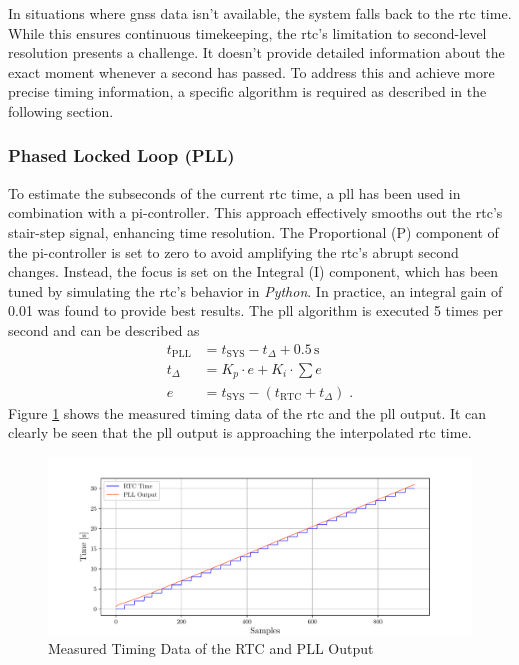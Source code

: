 In situations where \acrshort{gnss} data isn't available, the system falls back to the \acrshort{rtc} time.
While this ensures continuous timekeeping, the \acrshort{rtc}'s limitation to second-level resolution presents a challenge.
It doesn't provide detailed information about the exact moment whenever a second has passed.
To address this and achieve more precise timing information, a specific algorithm is required as described in the following section.

\subsubsection{Phased Locked Loop (PLL)}
To estimate the subseconds of the current \acrshort{rtc} time, a \acrfull{pll} has been used in combination with a \acrshort{pi}-controller.
This approach effectively smooths out the \acrshort{rtc}'s stair-step signal, enhancing time resolution.
The Proportional (P) component of the \acrshort{pi}-controller is set to zero to avoid amplifying the \acrshort{rtc}'s abrupt second changes.
Instead, the focus is set on the Integral (I) component, which has been tuned by simulating the \acrshort{rtc}'s behavior in \textit{Python}.
In practice, an integral gain of 0.01 was found to provide best results.
The \acrshort{pll} algorithm is executed 5 times per second and can be described as
\begin{equation}
	\begin{aligned}
		t_{\text{PLL}}
		 & =
		t_{\text{SYS}} - t_\Delta  + 0.5\,\text{s} \\
		t_\Delta
		 & =
		K_p \cdot e + K_i \cdot \sum e             \\
		e
		 & =
		t_{\text{SYS}} - (t_{\text{RTC}} + t_\Delta) \;.
	\end{aligned}
\end{equation}
Figure \ref{fig:pll_measured_data} shows the measured timing data of the \acrshort{rtc} and the \acrshort{pll} output.
It can clearly be seen that the \acrshort{pll} output is approaching the interpolated \acrshort{rtc} time.
\begin{figure}[h]
	\centering
	\includegraphics[width=1.0\textwidth]{images/6_design_final/PLL_Measured_Data_plot.pdf}
	\caption{Measured Timing Data of the RTC and PLL Output}
	\label{fig:pll_measured_data}
\end{figure}

